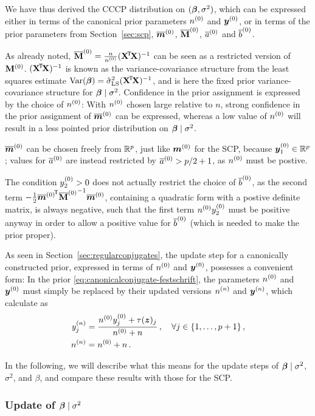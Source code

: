 We have thus derived the CCCP distribution on $(\boldsymbol{\beta},\sigma^2)$,
which can be expressed either in terms of the canonical prior parameters $n^{(0)}$ and ${\bm y}^{(0)}$,
or in terms of the prior parameters from Section~\ref{sec:scp}, $\overline{{\bm m}}^{(0)}$, $\overline{\mathbf{M}}^{(0)}$, $\overline{a}^{(0)}$ and $\overline{b}^{(0)}$.

As already noted, $\overline{\mathbf{M}}^{(0)} = \frac{n}{n^{(0)}}(\mathbf{X}^{{\mbox{\!\scriptsize\textsf{T}}}} \! \mathbf{X})^{-1}$ can be seen as a restricted version of $\mathbf{M}^{(0)}$.
$(\mathbf{X}^{{\mbox{\!\scriptsize\textsf{T}}}} \! \mathbf{X})^{-1}$ is known as the variance-covariance structure from the least squares estimate $\operatorname{Var}(\boldsymbol{\beta}) = \hat{\sigma}^2_\text{LS}(\mathbf{X}^{{\mbox{\!\scriptsize\textsf{T}}}} \! \mathbf{X})^{-1}$,
and is here the fixed prior variance-covariance structure for $\boldsymbol{\beta}\mid\sigma^2$.
Confidence in the prior assignment is expressed by the choice of $n^{(0)}$:
With $n^{(0)}$ chosen large relative to $n$, strong confidence in the prior assignment
of $\overline{{\bm m}}^{(0)}$ can be expressed, whereas a low value of $n^{(0)}$ will result in a less pointed
prior distribution on $\boldsymbol{\beta}\mid\sigma^2$.

$\overline{{\bm m}}^{(0)}$ can be chosen freely from $\mathbb{R}^p$, just like ${\bm m}^{(0)}$ for the SCP,
because ${\bm y}^{(0)}_1 \in \mathbb{R}^p$;
values for $\overline{a}^{(0)}$ are instead restricted by $\overline{a}^{(0)} > p/2 + 1$, as $n^{(0)}$ must be postive.

The condition $y^{(0)}_2 > 0$ does not actually restrict the choice of $\overline{b}^{(0)}$,
as the second term $-\frac{1}{2} {\overline{{\bm m}}^{(0)}}^{{\mbox{\!\scriptsize\textsf{T}}}} {\overline{\mathbf{M}}^{(0)}}^{-1} \overline{{\bm m}}^{(0)}$,
containing a quadratic form with a postive definite matrix,
is always negative, such that the first term $n^{(0)}y^{(0)}_2$ must be positive anyway
in order to allow a positive value for $\overline{b}^{(0)}$ (which is needed to make the prior proper).

As seen in Section~\ref{sec:regularconjugates},
the update step for a canonically constructed prior, expressed in terms of $n^{(0)}$ and ${\bm y}^{(0)}$,
possesses a convenient form: In the prior \eqref{eq:canonicalconjugate-festschrift},
the parameters $n^{(0)}$ and ${\bm y}^{(0)}$ must simply be replaced
by their updated versions $n^{(n)}$ and ${\bm y}^{(n)}$, which calculate as
\begin{align*}
y^{(n)}_j &= \frac{n^{(0)} y^{(0)}_j + \tau({\bm z})_j}{n^{(0)} + n}\,, \quad \forall j \in \{1, \ldots, p+1\}\,, \\
n^{(n)}   &= n^{(0)} + n \,.
\end{align*}

In the following, we will describe what this means for the update steps of
$\boldsymbol{\beta}\mid\sigma^2$, $\sigma^2$, and $\beta$, and compare these results
with those for the SCP. %


\subsubsection{Update of \texorpdfstring{$\boldsymbol{\beta}\mid\sigma^2$}{beta|sigma2}}
\label{sec:cccp-update1}

